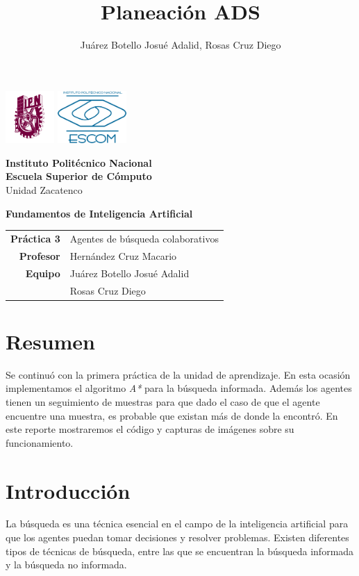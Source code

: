 \documentclass{article}
\author{Juárez Botello Josué Adalid, Rosas Cruz Diego}
\title{Planeación ADS}
\begin{document}
\begin{titlepage}
	\centering
	\includegraphics[height=2cm]{Logo_IPN.png}
	\hfill
	\includegraphics[height=2cm]{escudoESCOM.png}

	\vspace{-1.5cm}
	\large\textbf{ Instituto Politécnico Nacional}\\
	\large\textbf{Escuela Superior de Cómputo}\\
	\large{Unidad Zacatenco}

	\vspace{2cm}

	\Large{\textbf{Fundamentos de Inteligencia Artificial}}

	\vspace{10cm}

	\begin{tabular}{rl}
		\textbf{Práctica 3} & Agentes de búsqueda colaborativos \\
		\textbf{Profesor}   & Hernández Cruz Macario            \\
		\textbf{Equipo}     & Juárez Botello Josué Adalid       \\
		                    & Rosas Cruz Diego
	\end{tabular}
\end{titlepage}

\tableofcontents
\pagebreak

\section{Resumen}
Se continuó con la primera práctica de la unidad de aprendizaje. En esta ocasión implementamos el algoritmo \emph{A*} para la búsqueda informada. Además los agentes tienen un seguimiento de muestras para que dado el caso de que el agente encuentre una muestra, es probable que existan más de donde la encontró. En este reporte mostraremos el código y capturas de imágenes sobre su funcionamiento.
\section{Introducción}
La búsqueda es una técnica esencial en el campo de la inteligencia artificial para que los agentes puedan tomar decisiones y resolver problemas. Existen diferentes tipos de técnicas de búsqueda, entre las que se encuentran la búsqueda informada y la búsqueda no informada.
\end{document}
